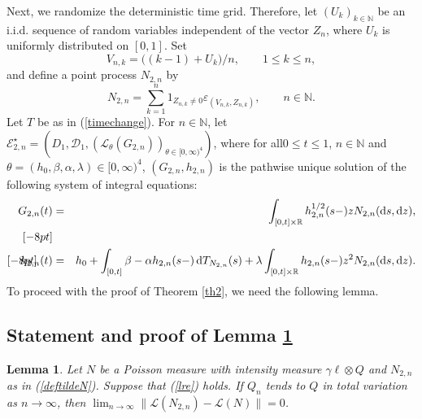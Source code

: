 \documentclass[number,citesort,seceqn,dvips]{arxbj}
\newcommand{\eqref}[1]{(\ref{#1})}
\newtheorem{lemma}{Lemma}[section]
\newcommand{\RR}{\mathbb{R}}
\newcommand{\NN}{\mathbb{N}}
\newcommand{\DDD}{{\mathcal D}}
\newcommand{\EEE}{{\mathcal E}}
\newcommand{\LLL}{{\mathcal L}}
\begin{document}
Next, we randomize the deterministic time grid. Therefore, let
$(U_k)_{k\in\NN}$ be an i.i.d. sequence of random variables independent
of the vector $Z_n$, where $U_k$ is uniformly distributed on $[0,1]$.
Set
%
\begin{equation}\label{defVnk}
V_{n,k} = \bigl((k - 1) + U_k\bigr)/n,\qquad 1\le k\le n,
\end{equation}
%
and define a point process $ N_{2,n}$ by
%
\begin{equation}\label{deftildeN}
N_{2,n}=\sum_{k=1}^n
1_{Z_{n,k}\neq0} \varepsilon_{(V_{n,k},Z_{n,k})},\qquad
n\in\NN .
\end{equation}
%
Let $T$ be as in \eqref{timechange}. For
$n\in\NN$, let
$\EEE^{\star}_{2,n}=(D_1,\DDD_1,(\LLL_{\theta}(G_{2,n}))_{\theta
\in[0,\infty)^4})$,
where for all\break $0\le t\le1$, $n\in\NN$ and
$\theta=(h_0,\beta,\alpha,\lambda)\in[0,\infty)^4$,
$(G_{2,n},h_{2,n})$ is the pathwise unique solution of the
following system of integral equations:
%
\begin{eqnarray}\label{EEE3}
 \hspace*{-15pt}G_{2,n}(t)& = &\int_{[0,t]\times\RR}
h^{1/2}_{2,n}(s-)z N_{2,n}(\mathrm{d}s,\mathrm{d}z),\nonumber\\ [-8pt]\\ [-8pt]
\hspace*{-15pt}h_{2,n}(t) & = & h_0+ \int_{[0,t]}\beta-\alpha
h_{2,n}(s-)\,\mathrm{d}T_{N_{2,n}} (s) + \lambda\int_{[0,t]\times\RR}
h_{2,n}(s-)z^2 N_{2,n}(\mathrm{d}s,\mathrm{d}z).\nonumber
\end{eqnarray}
%
To proceed with the proof of Theorem \ref{th2}, we need the following
lemma.

%
\subsection{\texorpdfstring{Statement and proof of Lemma \protect\ref{thinning}}
{Statement and proof of Lemma 4.1}}\label{SUBSEC4.2}

\begin{lemma}\label{thinning} Let $N$ be a Poisson measure with
intensity measure
$\gamma\ell\otimes Q$ and $N_{2,n}$ as in \eqref{deftildeN}. Suppose
that \eqref{lre} holds. If $Q_n$ tends to $Q$ in total variation as
$n\to\infty$, then $\lim_{n\to\infty}\|\LLL( N_{2,n})-\LLL(N)\|=0$.
\end{lemma}
\end{document}
